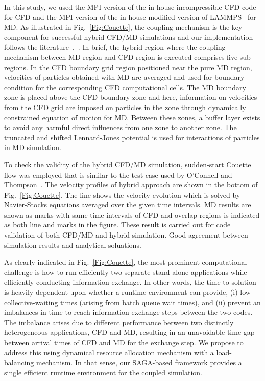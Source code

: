 \documentclass[conference,final]{IEEEtran}
\begin{document}
In this study, we used the MPI version of the in-house incompressible
CFD code~\cite{Lee} for CFD and the MPI version of the in-house
modified version of LAMMPS~\cite{LAMMPS} for MD. As illustrated in
Fig.~\ref{Fig:Couette}, the coupling mechanism is the key component
for successful hybrid CFD/MD simulations and our implementation
follows the literature~\cite{Nie},~\cite{Yen}. In brief, the hybrid
region where the coupling mechanism between MD region and CFD region
is executed comprises five sub-regions. In the CFD boundary grid
region positioned near the pure MD region, velocities of particles
obtained with MD are averaged and used for boundary condition for the
corresponding CFD computational cells. The MD boundary zone is placed
above the CFD boundary zone and here, information on velocities from
the CFD grid are imposed on particles in the zone through dynamically
constrained equation of motion for MD. Between these zones, a buffer
layer exists to avoid any harmful direct influences from one zone to
another zone. The truncated and shifted Lennard-Jones potential is
used for interactions of particles in MD simulation.


To check the validity of the hybrid CFD/MD simulation, sudden-start Couette flow was 
employed that is similar to the test case used by O'Connell and Thompson~\cite{Thompson}.
The velocity profiles of hybrid approach are shown in the bottom of Fig.~\ref{Fig:Couette}. The line shows 
the velocity evolution which is solved by Navier-Stocks equations averaged over the given 
time intervals. MD results are shown as marks with same time intervals of CFD and overlap 
regions is indicated as both line and marks in the figure. These result is carried out 
for code validation of both CFD/MD and hybrid simulation. Good agreement between 
simulation results and analytical soluations.

As clearly indicated in Fig.~\ref{Fig:Couette}, the most prominent
computational challenge is how to run efficiently two separate stand
alone applications while efficiently conducting information exchange.
In other words, the time-to-solution is heavily dependent upon whether
a runtime environment can provide, (i) low collective-waiting times
(arising from batch queue wait times), and (ii) prevent an imbalances
in time to reach information exchange steps between the two codes. The
imbalance arises due to different performance between two distinctly
heterogeneous applications, CFD and MD, resulting in an unavoidable
time gap between arrival times of CFD and MD for the exchange step. We
propose to address this using dynamical resource allocation mechanism
with a load-balancing mechanism. In that sense, our SAGA-based
framework provides a single efficient runtime environment for the
coupled simulation.
\end{document}
